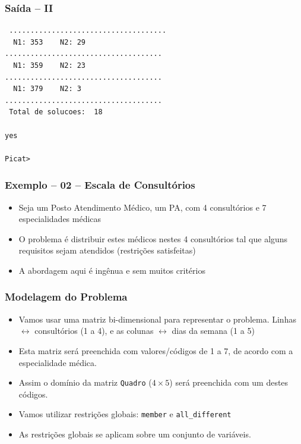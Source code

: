 \begin{frame}[fragile]

\frametitle{Saída -- II}

\begin{small}
\begin{verbatim}
 .....................................
  N1: 353	 N2: 29
.....................................
  N1: 359	 N2: 23
.....................................
  N1: 379	 N2: 3
.....................................
 Total de solucoes:  18 

yes

Picat> 
\end{verbatim}
    
\end{small}
\end{frame}
\begin{frame}[fragile] 

\frametitle{Exemplo -- 02 -- Escala de Consultórios}

\begin{itemize}
\item Seja um Posto Atendimento Médico, um PA, com 4 consultórios e 7 especialidades
  médicas

\pause
\item O problema é distribuir estes médicos nestes 4 consultórios
tal que alguns requisitos sejam atendidos (restrições  satisfeitas)

\pause
\item A abordagem aqui é ingênua e sem muitos critérios
\end{itemize}

\end{frame}
\begin{frame}[fragile] 

\frametitle{Modelagem do Problema}

\begin{itemize}
  \item  Vamos usar uma matriz bi-dimensional para 
  representar o problema. Linhas $\leftrightarrow$ consultórios (1 a 4), e 
  as colunas $\leftrightarrow$ dias da semana (1 a 5)

  \pause
  \item Esta matriz será preenchida com valores/códigos de 1 a 7, de acordo com a especialidade médica.
  
  \pause
  \item Assim o domínio da matriz \texttt{Quadro} ($4 \times 5$) será
  preenchida com um destes códigos.
   
  \pause
  \item Vamos utilizar restrições globais: \texttt{member} e \texttt{all\_different}

  \pause
  \item As restrições globais se aplicam sobre um conjunto de variáveis.


\end{itemize}

\end{frame}

